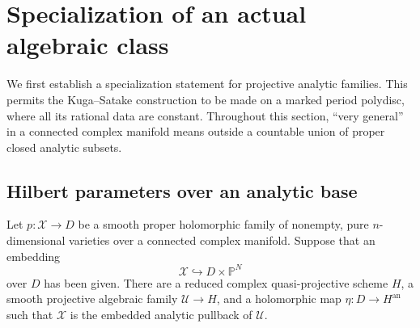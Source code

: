 \section{Specialization of an actual algebraic class}
\label{spec:section}

We first establish a specialization statement for projective analytic
families.  This permits the Kuga--Satake construction to be made on a
marked period polydisc, where all its rational data are constant.  Throughout
this section, ``very general'' in a connected complex manifold means
outside a countable union of proper closed analytic subsets.

\subsection{Hilbert parameters over an analytic base}

\begin{lemma}
\label{spec:hilbert-map}
Let $p:\mathcal X\to D$ be a smooth proper holomorphic family of
nonempty, pure $n$-dimensional varieties over a connected complex manifold.
Suppose that an embedding
\[
 \mathcal X\hookrightarrow D\times\mathbb P^N
\]
over $D$ has been given.  There are a reduced complex quasi-projective
scheme $H$, a smooth projective algebraic family
$\mathcal U\to H$, and a holomorphic map
$\eta:D\to H^{\mathrm{an}}$ such that $\mathcal X$ is the embedded
analytic pullback of $\mathcal U$.
\end{lemma}

